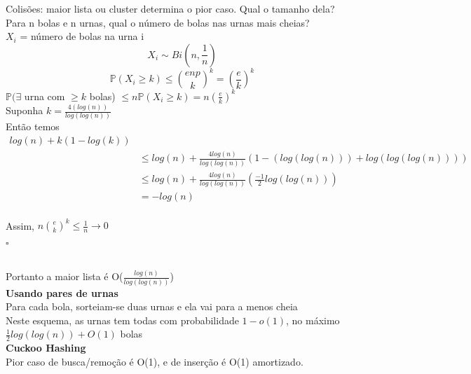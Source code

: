 Colisões: maior lista ou cluster determina o pior caso. Qual o tamanho dela?
\\
Para n bolas e n urnas, qual o número de bolas nas urnas mais cheias?
\\
$X_{i}$ = número de bolas na urna i
\[X_{i}\sim Bi(n,\frac{1}{n})\]
\[\mathbb{P}(X_{i}\geq k) \leq {enp\choose k}^{k} = (\frac{e}{k})^{k}\]
$\mathbb{P}(\exists$ urna com $\geq k$ bolas) $\leq n\mathbb{P}(X_{i}\geq k) = n(\frac{e}{k})^{k}$
\\
Suponha $k = \frac{4(log(n))}{log(log(n))}$
\\
Então temos
\begin{align*}
	log(n)+ k(1-log(k)) \\
	&\leq log(n) + \frac{4log(n)}{log(log(n))}(1-(log(log(n)))+log(log(log(n)))) \\
	&\leq log(n) + \frac{4log(n)}{log(log(n))}(\frac{-1}{2}log(log(n))) \\
	&= -log(n)
\end{align*}
\\
Assim, $n{e\choose k}^{k}\leq\frac{1}{n}\rightarrow 0$\\

\begin{flushright}
$\square$
\end{flushright}\\

Portanto a maior lista é O($\frac{log(n)}{log(log(n))}$)\\

\textbf{Usando pares de urnas}\\
Para cada bola, sorteiam-se duas urnas e ela vai para a menos cheia
\\
Neste esquema, as urnas tem todas com probabilidade $1-o(1)$, no máximo
$\frac{1}{2}log(log(n)) + O(1)$ bolas
\\
\textbf{Cuckoo Hashing}\\
Pior caso de busca/remoção é O(1), e de inserção é O(1) amortizado.